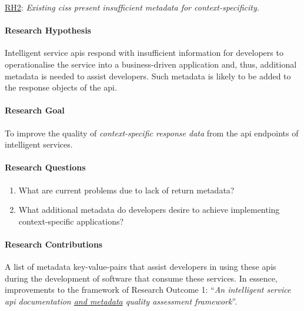 \begin{titled-frame}{\underline{RH2}: \textit{Existing \glspl{cis} present insufficient metadata for context-specificity.} }
\vspace{-12pt}
\paragraph{Research Hypothesis}
Intelligent service \glspl{api} respond with insufficient information for developers to operationalise the service into a business-driven application and, thus, additional metadata is needed to assist developers. Such metadata is likely to be added to the response objects of the \gls{api}.

\paragraph{Research Goal}
To improve the quality of \textit{context-specific response data} from the \gls{api} endpoints of intelligent services.

\paragraph{Research Questions}
\begin{enumerate}[label=\textbf{RQ2.\arabic*.}, ref=RQ2.\arabic*, leftmargin=3.5\parindent, rightmargin=1\parindent]
  \item What are current problems due to lack of return metadata?
  \label{rqs:metadata:what-problems-due-to-lack-of-metadata}
  
  
  \item What additional metadata do developers desire to achieve implementing context-specific applications?
  \label{rqs:metadata:what-metadata-do-devs-want-and-why}
\end{enumerate}

\paragraph{Research Contributions} A list of metadata key-value-pairs that assist developers in using these \glspl{api} during the development of software that consume these services. In essence, improvements to the framework of Research Outcome 1: ``\textit{An intelligent service \gls{api} documentation \underline{\upshape and metadata} quality assessment framework}''.


\end{titled-frame}
